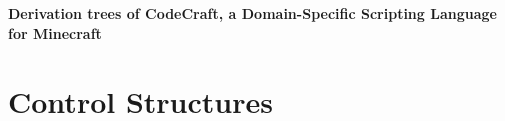 \documentclass{article}
\begin{document}
\begin{center}
    {\Large \textbf{Derivation trees of CodeCraft, a Domain-Specific Scripting Language for Minecraft}}
\end{center}

\vspace{5mm}


\newpage

\section{Control Structures}




\end{document}
